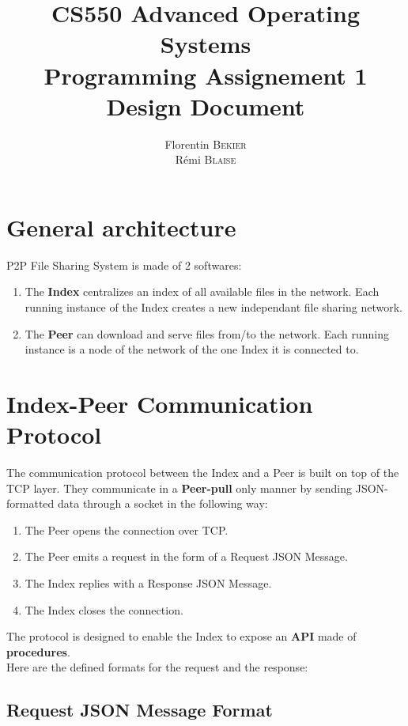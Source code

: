 \documentclass{article}
\title{\textbf{CS550 Advanced Operating Systems\\Programming Assignement 1\\Design Document}}
\author{Florentin \textsc{Bekier}\\Rémi \textsc{Blaise}}
\date{}
\begin{document}
\maketitle

\section{General architecture}

P2P File Sharing System is made of 2 softwares:

\begin{enumerate}
	\item The \textbf{Index} centralizes an index of all available files in the network. Each running instance of the Index creates a new independant file sharing network.
	\item The \textbf{Peer} can download and serve files from/to the network. Each running instance is a node of the network of the one Index it is connected to.
\end{enumerate}

\section{Index-Peer Communication Protocol}

The communication protocol between the Index and a Peer is built on top of the TCP layer.
They communicate in a \textbf{Peer-pull} only manner by sending JSON-formatted data through a socket in the following way:

\begin{enumerate}
	\item The Peer opens the connection over TCP.
	\item The Peer emits a request in the form of a Request JSON Message.
	\item The Index replies with a Response JSON Message.
	\item The Index closes the connection.
\end{enumerate}

\noindent The protocol is designed to enable the Index to expose an \textbf{API} made of \textbf{procedures}. \\
Here are the defined formats for the request and the response:

\subsection{Request JSON Message Format}
\end{document}
